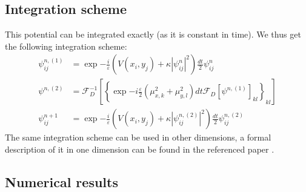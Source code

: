 \documentclass{article}
\begin{document}
\subsection{Integration scheme}
This potential can be integrated exactly (as it is constant in time). We thus get the following integration scheme:
$$
\begin{aligned}
\psi^{n,(1)}_{ij}&=\exp{-\frac{i}{\varepsilon}\left(V(x_i,y_j)+\kappa|\psi^n_{ij}|^{2}\right)\frac{dt}{2}}\psi^n_{ij}\\
\psi^{n,(2)}&=\mathcal{F}_D^{-1}\left[\left\{\exp{-i\frac{\varepsilon}{2}\left(\mu_{x,k}^2+\mu_{y,l}^2\right)dt}\mathcal{F}_D\left[\psi^{n,(1)}\right]_{kl}\right\}_{kl}\right]\\
\psi^{n+1}_{ij}&=\exp{-\frac{i}{\varepsilon}\left(V(x_i,y_j)+\kappa|\psi^{n,(2)}_{ij}|^{2}\right)\frac{dt}{2}}\psi^{n,(2)}_{ij}
\end{aligned}
$$
The same integration scheme can be used in other dimensions, a formal description of it in one dimension can be found in the referenced paper \cite{bao1}. 

\subsection{Numerical results}
\end{document}
